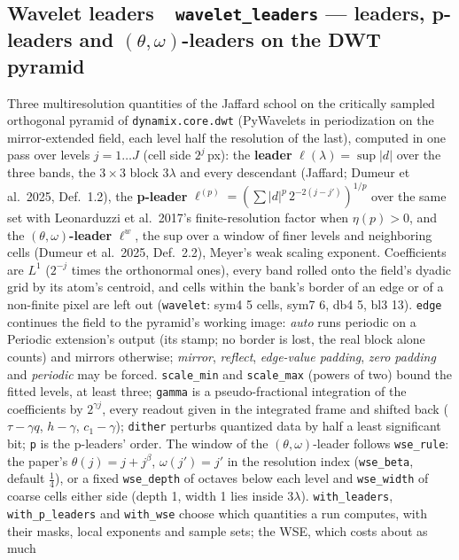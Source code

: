 \documentclass[10pt]{article}
\newcommand{\dev}[1]{\texttt{#1}}
\newcommand{\tool}[2]{#1~\textperiodcentered~\dev{#2}}
\begin{document}
\subsection{\tool{Wavelet leaders}{wavelet\_leaders} --- leaders, p-leaders and $(\theta,\omega)$-leaders on the DWT pyramid}
Three multiresolution quantities of the Jaffard school on the critically sampled orthogonal
pyramid of \texttt{dynamix.core.dwt} (PyWavelets in periodization on the mirror-extended field,
each level half the resolution of the last), computed in one pass over levels $j = 1 \dots J$
(cell side $2^j$\,px): the \textbf{leader} $\ell(\lambda) = \sup |d|$ over the three bands, the
$3\times3$ block $3\lambda$ and every descendant (Jaffard; Dumeur et al.\ 2025, Def.~1.2), the
\textbf{p-leader} $\ell^{(p)} = (\sum |d|^p\,2^{-2(j-j')})^{1/p}$ over the same set with
Leonarduzzi et al.\ 2017's finite-resolution factor when $\eta(p) > 0$, and the
\textbf{$(\theta,\omega)$-leader} $\ell^w$, the sup over a window of finer levels and
neighboring cells (Dumeur et al.\ 2025, Def.~2.2), Meyer's weak scaling exponent. Coefficients
are $L^1$ ($2^{-j}$ times the orthonormal ones), every band rolled onto the field's dyadic grid by
its atom's centroid, and cells within the bank's border of an edge or of a non-finite pixel are
left out (\texttt{wavelet}: sym4 5 cells, sym7 6, db4 5, bl3 13). \texttt{edge} continues the field to the
pyramid's working image: \emph{auto} runs periodic on a Periodic extension's output (its stamp; no border is lost,
the real block alone counts) and mirrors otherwise; \emph{mirror}, \emph{reflect}, \emph{edge-value padding},
\emph{zero padding} and \emph{periodic} may be forced. \texttt{scale\_min} and
\texttt{scale\_max} (powers of two) bound the fitted levels, at least three; \texttt{gamma} is a
pseudo-fractional integration of the coefficients by $2^{\gamma j}$, every readout given in the
integrated frame and shifted back ($\tau - \gamma q$, $h - \gamma$, $c_1 - \gamma$);
\texttt{dither} perturbs quantized data by half a least significant bit; \texttt{p} is the
p-leaders' order. The window of the $(\theta,\omega)$-leader follows \texttt{wse\_rule}: the
paper's $\theta(j) = j + j^{\beta}$, $\omega(j') = j'$ in the resolution index (\texttt{wse\_beta},
default $\tfrac14$), or a fixed \texttt{wse\_depth} of octaves below each level and
\texttt{wse\_width} of coarse cells either side (depth 1, width 1 lies inside $3\lambda$).
\texttt{with\_leaders}, \texttt{with\_p\_leaders} and \texttt{with\_wse} choose which quantities a
run computes, with their masks, local exponents and sample sets; the WSE, which costs about as much
\end{document}
